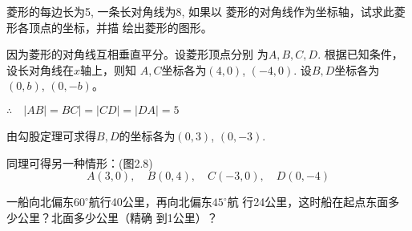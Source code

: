 \begin{example}
    菱形的每边长为5, 一条长对角线为8, 如果以
    菱形的对角线作为坐标轴，试求此菱形各顶点的坐标，并描
    绘出菱形的图形。
\end{example}

\begin{solution}
    因为菱形的对角线互相垂直平分。设菱形顶点分别
为$A,B,C,D$. 根据已知条件，设长对角线在$x$轴上，则知
$A,C$坐标各为$(4,0)$, $(-4,0)$. 设$B,D$坐标各为$(0,b)$,
$(0,-b)$。

$\therefore\quad |AB|=BC|=|CD|=|DA|=5$

由勾股定理可求得$B,D$的坐标各为$(0,3)$, $(0,-3)$.

同理可得另一种情形：(图2.8)
\[A(3,0),\quad B(0,4),\quad C(-3,0),\quad D(0,-4)\]
\begin{figure}[htp]
    \centering
    \caption{}
\end{figure}

\end{solution}

\begin{example}
  一船向北偏东$60^{\circ}$航行40公里，再向北偏东$45^{\circ}$航
行24公里，这时船在起点东面多少公里？北面多少公里（精确
到1公里）？  
\end{example}

